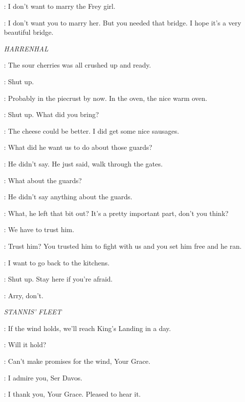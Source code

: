\ROBB: I don't want to marry the Frey girl. 

\TALISA: I don't want you to marry her. But you needed that bridge. I hope it's a very beautiful bridge. 



\scene

\textit{HARRENHAL} 


\HOTPIE: The sour cherries was all crushed up and ready. 

\GENDRY: Shut up. 

\HOTPIE: Probably in the piecrust by now. In the oven, the nice warm oven. 

\ARYA: Shut up. What did you bring? 

\HOTPIE: The cheese could be better. I did get some nice sausages. 

\GENDRY: What did he want us to do about those guards? 

\ARYA: He didn't say. He just said, walk through the gates. 

\GENDRY: What about the guards? 

\ARYA: He didn't say anything about the guards. 

\GENDRY: What, he left that bit out? It's a pretty important part, don't you think? 

\ARYA: We have to trust him. 

\GENDRY: Trust him? You trusted him to fight with us and you set him free and he ran. 

\HOTPIE: I want to go back to the kitchens. 

\ARYA: Shut up. Stay here if you're afraid. 

\HOTPIE: Arry, don't. 


\scene

\textit{STANNIS' FLEET} 


\DAVOS: If the wind holds, we'll reach King's Landing in a day. 

\STANNIS: Will it hold? 

\DAVOS: Can't make promises for the wind, Your Grace. 

\STANNIS: I admire you, Ser Davos. 

\DAVOS: I thank you, Your Grace. Pleased to hear it. 

